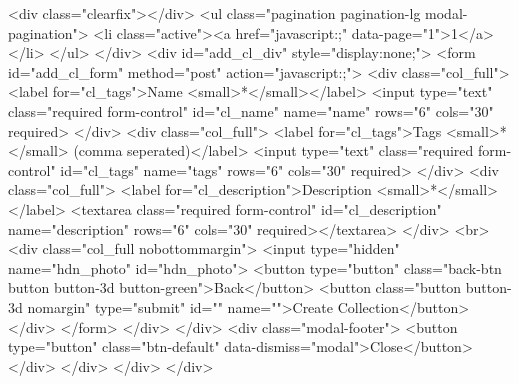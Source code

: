 <div class="clearfix"></div>
<ul class="pagination pagination-lg modal-pagination">
<li class="active"><a href="javascript:;" data-page="1">1</a></li>
</ul>
</div>
<div id="add_cl_div" style="display:none;">
<form id="add_cl_form" method="post" action="javascript:;">
<div class="col_full">
<label for="cl_tags">Name <small>*</small></label>
<input type="text" class="required form-control" id="cl_name" name="name" rows="6" cols="30" required>
</div>
<div class="col_full">
<label for="cl_tags">Tags <small>*</small> (comma seperated)</label>
<input type="text" class="required form-control" id="cl_tags" name="tags" rows="6" cols="30" required>
</div>
<div class="col_full">
<label for="cl_description">Description <small>*</small></label>
<textarea class="required form-control" id="cl_description" name="description" rows="6" cols="30" required></textarea>
</div>
<br>
<div class="col_full nobottommargin">
<input type="hidden" name="hdn_photo" id="hdn_photo">
<button type="button" class="back-btn button button-3d button-green">Back</button>
<button class="button button-3d nomargin" type="submit" id="" name="">Create Collection</button>
</div>
</form>
</div>
</div>
<div class="modal-footer">
<button type="button" class="btn-default" data-dismiss="modal">Close</button>
</div>
</div>
</div>
</div>

